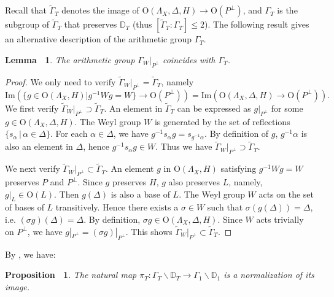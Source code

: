 \documentclass[12pt,reqno,a4paper]{amsart}
\newtheorem{lem}[thm]{Lemma~}
\newtheorem{prop}[thm]{Proposition~}
\theoremstyle{remark}
\theoremstyle{definition}
\begin{document}
Recall that $\widetilde{\Gamma}_T$ denotes the image of $\mathrm{O}(\Lambda_X,\Delta,H) \to \mathrm{O}(P^\perp)$, and $\Gamma_T$ is the subgroup of $\widetilde{\Gamma}_T$ that preserves $\mathbb{D}_T$ (thus $[\widetilde{\Gamma}_T:\Gamma_T]\le 2$).
The following result gives an alternative description of the arithmetic group $\Gamma_T$.
\begin{lem}
\label{lem: Gamma_W|_P^perp = Gamma_T}
    The arithmetic group $\Gamma_W|_{P^\perp}$ coincides with $\Gamma_T$.
\end{lem}
\begin{proof}
    We only need to verify $\widetilde{\Gamma}_W|_{P^\perp}=\widetilde{\Gamma}_T$, namely
    \begin{equation*}
        \mathrm{Im}( \{ g\in \mathrm{O}(\Lambda_X,H) \big| g^{-1}Wg=W \} \to \mathrm{O}(P^\perp) ) = \mathrm{Im} ( \mathrm{O}(\Lambda_X,\Delta,H) \to \mathrm{O}(P^\perp) ).
    \end{equation*}
    We first verify $\widetilde\Gamma_W|_{P^\perp} \supset \widetilde\Gamma_T$.
    An element in $\widetilde\Gamma_T$ can be expressed as $g|_{P^\perp}$ for some $g\in \mathrm{O}(\Lambda_X,\Delta,H)$.
    The Weyl group $W$ is generated by the set of reflections $\{ s_\alpha \,|\, \alpha\in \Delta \}$.
    For each $\alpha\in \Delta$, we have $g^{-1} s_\alpha g = s_{g^{-1}\alpha}$.
    By definition of $g$, $g^{-1}\alpha$ is also an element in $\Delta$, hence $g^{-1} s_\alpha g \in W$.
    Thus we have $\widetilde\Gamma_W|_{P^\perp} \supset \widetilde\Gamma_T$.

    We next verify $\widetilde\Gamma_W|_{P^\perp} \subset \widetilde\Gamma_T$.
    An element $g$ in $\mathrm{O}(\Lambda_X,H)$ satisfying $g^{-1}Wg=W$ preserves $P$ and $P^\perp$.
    Since $g$ preserves $H$, $g$ also preserves $L$, namely, $g|_{L}\in \mathrm{O}(L)$.
    Then $g(\Delta)$ is also a base of $L$.
    The Weyl group $W$ acts on the set of bases of $L$ transitively.
    Hence there exists a $\sigma\in W$ such that $\sigma (g(\Delta)) = \Delta$, i.e. $(\sigma g) (\Delta) = \Delta$.
    By definition, $\sigma g\in \mathrm{O}(\Lambda_X,\Delta,H)$. 
    Since $W$ acts trivially on $P^\perp$, we have $g|_{P^\perp} = (\sigma g)|_{P^\perp}$.
    This shows $\widetilde\Gamma_W|_{P^\perp} \subset \widetilde\Gamma_T$.
\end{proof}

By \cite[Proposition A.5]{yu2020fourfolds}, we have:
\begin{prop}
    The natural map $\pi_T\colon \Gamma_T\backslash \mathbb{D}_T \to \Gamma_1\backslash \mathbb{D}_1$ is a normalization of its image.
\end{prop}
\end{document}
